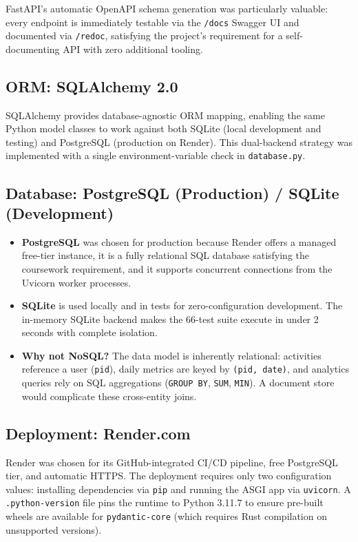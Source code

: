 \documentclass[10pt,a4paper]{article}
\begin{document}
FastAPI's automatic OpenAPI schema generation was particularly valuable: every endpoint is immediately testable via the \texttt{/docs} Swagger UI and documented via \texttt{/redoc}, satisfying the project's requirement for a self-documenting API with zero additional tooling.

\subsection{ORM: SQLAlchemy 2.0}

SQLAlchemy provides database-agnostic ORM mapping, enabling the same Python model classes to work against both SQLite (local development and testing) and PostgreSQL (production on Render). This dual-backend strategy was implemented with a single environment-variable check in \texttt{database.py}.

\subsection{Database: PostgreSQL (Production) / SQLite (Development)}

\begin{itemize}[leftmargin=1.5em]
  \item \textbf{PostgreSQL} was chosen for production because Render offers a managed free-tier instance, it is a fully relational SQL database satisfying the coursework requirement, and it supports concurrent connections from the Uvicorn worker processes.
  \item \textbf{SQLite} is used locally and in tests for zero-configuration development. The in-memory SQLite backend makes the 66-test suite execute in under 2 seconds with complete isolation.
  \item \textbf{Why not NoSQL?} The data model is inherently relational: activities reference a user (\texttt{pid}), daily metrics are keyed by \texttt{(pid, date)}, and analytics queries rely on SQL aggregations (\texttt{GROUP BY}, \texttt{SUM}, \texttt{MIN}). A document store would complicate these cross-entity joins.
\end{itemize}

\subsection{Deployment: Render.com}

Render was chosen for its GitHub-integrated CI/CD pipeline, free PostgreSQL tier, and automatic HTTPS. The deployment requires only two configuration values: installing dependencies via \texttt{pip} and running the ASGI app via \texttt{uvicorn}. A \texttt{.python-version} file pins the runtime to Python 3.11.7 to ensure pre-built wheels are available for \texttt{pydantic-core} (which requires Rust compilation on unsupported versions).
\end{document}
